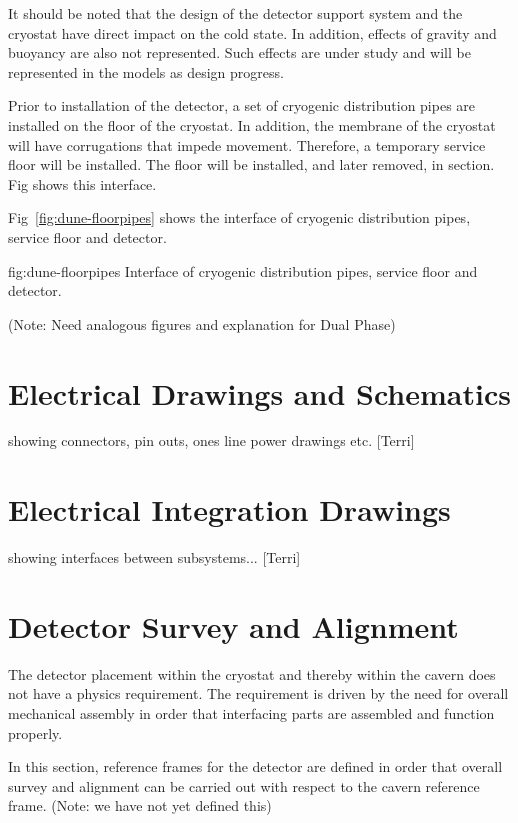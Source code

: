 It should be noted that the design of the detector support system and
the cryostat have direct impact on the cold state. In addition,
effects of gravity and buoyancy are also not represented. Such effects
are under study and will be represented in the models as design
progress.

Prior to installation of the detector, a set of cryogenic distribution
pipes are installed on the floor of the cryostat. In addition, the
membrane of the cryostat will have corrugations that impede
movement. Therefore, a temporary service floor will be installed. The
floor will be installed, and later removed, in section. Fig shows this
interface.

Fig~\ref{fig:dune-floorpipes} shows the interface of cryogenic
distribution pipes, service floor and detector.
\begin{dunefigure}{fig:dune-floorpipes} {Interface of cryogenic distribution pipes, service floor and detector.}
\end{dunefigure}


(Note: Need analogous figures and explanation for Dual Phase)


\section{Electrical Drawings and Schematics}
\label{sec:fdsp-coord-electrical}
showing connectors, pin outs, ones line power drawings etc. [Terri]


\section{Electrical Integration Drawings}
\label{sec:fdsp-coord-integ-electrical}
showing interfaces between subsystems... [Terri]


\section{Detector Survey and Alignment}
\label{sec:fdsp-coord-integ-survey}
The detector placement within the cryostat and thereby within the
cavern does not have a physics requirement. The requirement is driven
by the need for overall mechanical assembly in order that interfacing
parts are assembled and function properly.

In this section, reference frames for the detector are defined in order
that overall survey and alignment can be carried out with respect to
the cavern reference frame. (Note: we have not yet defined this)

